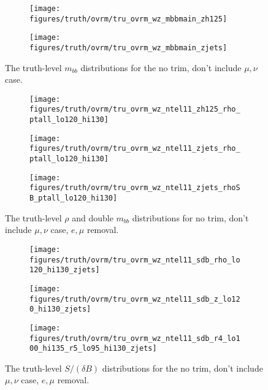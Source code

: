 \begin{figure}[!htbp]\captionsetup{justification=centering}
\begin{center}
\begin{subfigure}[t]{18pc}\centering\texttt{[image: figures/truth/ovrm/tru\_ovrm\_wz\_mbbmain\_zh125]}\caption{}\end{subfigure}
\begin{subfigure}[t]{18pc}\centering\texttt{[image: figures/truth/ovrm/tru\_ovrm\_wz\_mbbmain\_zjets]}\caption{}\end{subfigure}
\caption{\label{fig:mbbwzovrm}The truth-level $m_{bb}$ distributions for the no trim, don't include $\mu,\nu$ case.}
\end{center}
\end{figure}
\begin{figure}[!htbp]\captionsetup{justification=centering}
\begin{center}
\begin{subfigure}[t]{18pc}\centering\texttt{[image: figures/truth/ovrm/tru\_ovrm\_wz\_ntel11\_zh125\_rho\_ptall\_lo120\_hi130]}\caption{}\end{subfigure}
\begin{subfigure}[t]{18pc}\centering\texttt{[image: figures/truth/ovrm/tru\_ovrm\_wz\_ntel11\_zjets\_rho\_ptall\_lo120\_hi130]}\caption{}\end{subfigure}
\begin{subfigure}[t]{18pc}\centering\texttt{[image: figures/truth/ovrm/tru\_ovrm\_wz\_ntel11\_zjets\_rhoSB\_ptall\_lo120\_hi130]}\caption{}\end{subfigure}
\caption{\label{fig:rhowzovrm}The truth-level $\rho$ and double $m_{bb}$ distributions for no trim, don't include $\mu,\nu$ case, $e,\mu$ removal.}
\end{center}
\end{figure}
\begin{figure}[!htbp]\captionsetup{justification=centering}
\begin{center}
\begin{subfigure}[t]{18pc}\centering\texttt{[image: figures/truth/ovrm/tru\_ovrm\_wz\_ntel11\_sdb\_rho\_lo120\_hi130\_zjets]}\caption{}\end{subfigure}
\begin{subfigure}[t]{18pc}\centering\texttt{[image: figures/truth/ovrm/tru\_ovrm\_wz\_ntel11\_sdb\_z\_lo120\_hi130\_zjets]}\caption{}\end{subfigure}
\begin{subfigure}[t]{18pc}\centering\texttt{[image: figures/truth/ovrm/tru\_ovrm\_wz\_ntel11\_sdb\_r4\_lo100\_hi135\_r5\_lo95\_hi130\_zjets]}\caption{}\end{subfigure}
\caption{\label{fig:sdbwzovrm}The truth-level $S/(\delta B)$ distributions for the no trim, don't include $\mu,\nu$ case, $e,\mu$ removal.}
\end{center}
\end{figure}


